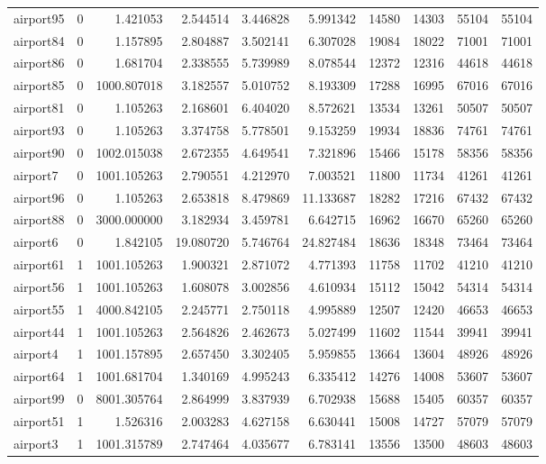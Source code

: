 \begin{longtable}{|l|r|r|r|r|r|r|r|r|r|}
airport95 & 0 & 1.421053 & 2.544514 & 3.446828 & 5.991342 & 14580 & 14303 & 55104 & 55104 \\
airport84 & 0 & 1.157895 & 2.804887 & 3.502141 & 6.307028 & 19084 & 18022 & 71001 & 71001 \\
airport86 & 0 & 1.681704 & 2.338555 & 5.739989 & 8.078544 & 12372 & 12316 & 44618 & 44618 \\
airport85 & 0 & 1000.807018 & 3.182557 & 5.010752 & 8.193309 & 17288 & 16995 & 67016 & 67016 \\
airport81 & 0 & 1.105263 & 2.168601 & 6.404020 & 8.572621 & 13534 & 13261 & 50507 & 50507 \\
airport93 & 0 & 1.105263 & 3.374758 & 5.778501 & 9.153259 & 19934 & 18836 & 74761 & 74761 \\
airport90 & 0 & 1002.015038 & 2.672355 & 4.649541 & 7.321896 & 15466 & 15178 & 58356 & 58356 \\
airport7 & 0 & 1001.105263 & 2.790551 & 4.212970 & 7.003521 & 11800 & 11734 & 41261 & 41261 \\
airport96 & 0 & 1.105263 & 2.653818 & 8.479869 & 11.133687 & 18282 & 17216 & 67432 & 67432 \\
airport88 & 0 & 3000.000000 & 3.182934 & 3.459781 & 6.642715 & 16962 & 16670 & 65260 & 65260 \\
airport6 & 0 & 1.842105 & 19.080720 & 5.746764 & 24.827484 & 18636 & 18348 & 73464 & 73464 \\
airport61 & 1 & 1001.105263 & 1.900321 & 2.871072 & 4.771393 & 11758 & 11702 & 41210 & 41210 \\
airport56 & 1 & 1001.105263 & 1.608078 & 3.002856 & 4.610934 & 15112 & 15042 & 54314 & 54314 \\
airport55 & 1 & 4000.842105 & 2.245771 & 2.750118 & 4.995889 & 12507 & 12420 & 46653 & 46653 \\
airport44 & 1 & 1001.105263 & 2.564826 & 2.462673 & 5.027499 & 11602 & 11544 & 39941 & 39941 \\
airport4 & 1 & 1001.157895 & 2.657450 & 3.302405 & 5.959855 & 13664 & 13604 & 48926 & 48926 \\
airport64 & 1 & 1001.681704 & 1.340169 & 4.995243 & 6.335412 & 14276 & 14008 & 53607 & 53607 \\
airport99 & 0 & 8001.305764 & 2.864999 & 3.837939 & 6.702938 & 15688 & 15405 & 60357 & 60357 \\
airport51 & 1 & 1.526316 & 2.003283 & 4.627158 & 6.630441 & 15008 & 14727 & 57079 & 57079 \\
airport3 & 1 & 1001.315789 & 2.747464 & 4.035677 & 6.783141 & 13556 & 13500 & 48603 & 48603 \\

\end{longtable}
